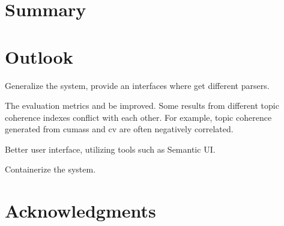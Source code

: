 \documentclass{article} %
\begin{document}
\section{Summary}

\section{Outlook}
Generalize the system, provide an interfaces where get different parsers.

The evaluation metrics and be improved. Some results from different topic coherence indexes conflict with each other. For example, topic coherence generated from c\textunderscore{}umass \cite{mimno_optimizing_nodate} and c\textunderscore{}v \cite{roder_exploring_2015} are often negatively correlated.

Better user interface, utilizing tools such as Semantic UI.

Containerize the system.


\section*{Acknowledgments}



\end{document}
